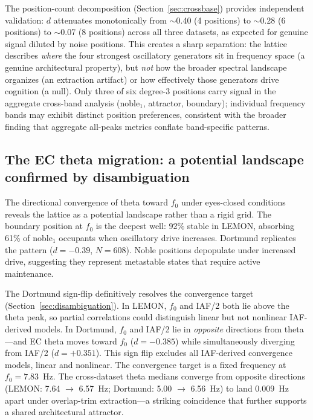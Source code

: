\documentclass[11pt,a4paper]{article}
\newcommand{\fzero}{f_0}
\begin{document}
The position-count decomposition (Section~\ref{sec:crossbase}) provides independent validation: $d$ attenuates monotonically from $\sim$0.40 (4 positions) to $\sim$0.28 (6 positions) to $\sim$0.07 (8 positions) across all three datasets, as expected for genuine signal diluted by noise positions. This creates a sharp separation: the lattice describes \textit{where} the four strongest oscillatory generators sit in frequency space (a genuine architectural property), but \textit{not} how the broader spectral landscape organizes (an extraction artifact) or how effectively those generators drive cognition (a null). Only three of six degree-3 positions carry signal in the aggregate cross-band analysis (noble$_1$, attractor, boundary); individual frequency bands may exhibit distinct position preferences, consistent with the broader finding that aggregate all-peaks metrics conflate band-specific patterns.

\subsection{The EC theta migration: a potential landscape confirmed by disambiguation}

The directional convergence of theta toward $\fzero$ under eyes-closed conditions reveals the lattice as a potential landscape rather than a rigid grid. The boundary position at $\fzero$ is the deepest well: 92\% stable in LEMON, absorbing 61\% of noble$_1$ occupants when oscillatory drive increases. Dortmund replicates the pattern ($d = -0.39$, $N = 608$). Noble positions depopulate under increased drive, suggesting they represent metastable states that require active maintenance.

The Dortmund sign-flip definitively resolves the convergence target (Section~\ref{sec:disambiguation}). In LEMON, $\fzero$ and IAF/2 both lie above the theta peak, so partial correlations could distinguish linear but not nonlinear IAF-derived models. In Dortmund, $\fzero$ and IAF/2 lie in \textit{opposite} directions from theta---and EC theta moves toward $\fzero$ ($d = -0.385$) while simultaneously diverging from IAF/2 ($d = +0.351$). This sign flip excludes all IAF-derived convergence models, linear and nonlinear. The convergence target is a fixed frequency at $\fzero = 7.83$~Hz. The cross-dataset theta medians converge from opposite directions (LEMON: 7.64 $\to$ 6.57~Hz; Dortmund: 5.00 $\to$ 6.56~Hz) to land 0.009~Hz apart under overlap-trim extraction---a striking coincidence that further supports a shared architectural attractor.
\end{document}
